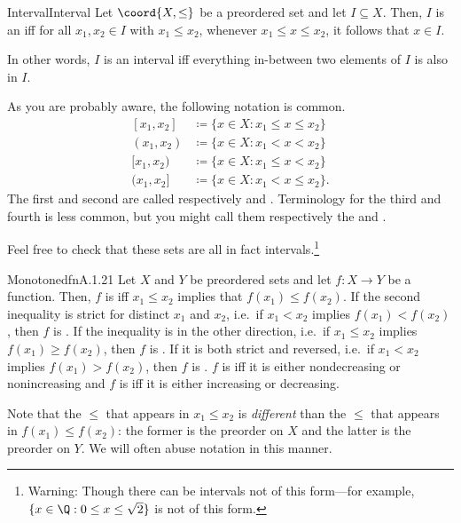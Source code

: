 \begin{dfn}{Interval}{Interval}
Let $\coord{X,\leq}$ be a preordered set and let $I\subseteq X$.  Then, $I$ is an  iff for all $x_1,x_2\in I$ with $x_1\leq x_2$, whenever $x_1\leq x\leq x_2$, it follows that $x\in I$.
\begin{rmk}
In other words, $I$ is an interval iff everything in-between two elements of $I$ is also in $I$.
\end{rmk}
\begin{rmk}
As you are probably aware, the following notation is common.
\begin{subequations}
\begin{align}
[x_1,x_2] & \coloneqq \{ x\in X:x_1\leq x\leq x_2\} \\
(x_1,x_2) & \coloneqq \{ x\in X:x_1<x<x_2\} \\
[x_1,x_2) & \coloneqq \{ x\in X:x_1\leq x<x_2\} \\
(x_1,x_2] & \coloneqq \{ x\in X:x_1<x\leq x_2\} .
\end{align}
\end{subequations}
The first and second are called respectively  and .  Terminology for the third and fourth is less common, but you might call them respectively the  and .

Feel free to check that these sets are all in fact intervals.\footnote{Warning:  Though there can be intervals not of this form---for example, $\{ x\in \Q :0\leq x\leq \sqrt{2}\}$ is not of this form.}
\end{rmk}
\end{dfn}
\begin{dfn}{Monotone}{dfnA.1.21}
Let $X$ and $Y$ be preordered sets and let $f\colon X\rightarrow Y$ be a function.  Then, $f$ is  iff $x_1\leq x_2$ implies that $f(x_1)\leq f(x_2)$.  If the second inequality is strict for distinct $x_1$ and $x_2$, i.e.~if $x_1<x_2$ implies $f(x_1)<f(x_2)$, then $f$ is .  If the inequality is in the other direction, i.e.~if $x_1\leq x_2$ implies $f(x_1)\geq f(x_2)$, then $f$ is .  If it is both strict and reversed, i.e.~if $x_1<x_2$ implies $f(x_1)>f(x_2)$, then $f$ is .  $f$ is  iff it is either nondecreasing or nonincreasing and $f$ is  iff it is either increasing or decreasing.
\begin{rmk}
Note that the $\leq$ that appears in $x_1\leq x_2$ is \emph{different} than the $\leq$ that appears in $f(x_1)\leq f(x_2)$:  the former is the preorder on $X$ and the latter is the preorder on $Y$.  We will often abuse notation in this manner.
\end{rmk}
\end{dfn}

